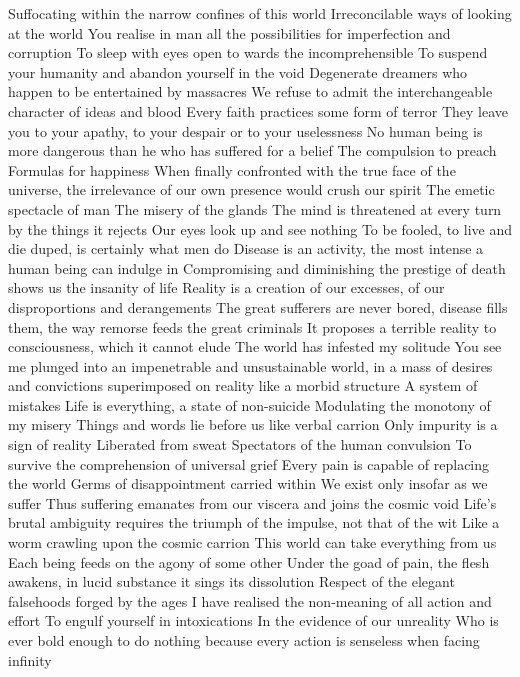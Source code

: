 \documentclass{article}
\begin{document}
Suffocating within the narrow confines of this world
Irreconcilable ways of looking at the world
You realise in man all the possibilities for imperfection and corruption
To sleep with eyes open to wards the incomprehensible
To suspend your humanity and abandon yourself in the void
Degenerate dreamers who happen to be entertained by massacres
We refuse to admit the interchangeable character of ideas and blood
Every faith practices some form of terror
They leave you to your apathy, to your despair or to your uselessness
No human being is more dangerous than he who has suffered for a belief
The compulsion to preach
Formulas for happiness
When finally confronted with the true face of the universe, the irrelevance of our own presence would crush our spirit
The emetic spectacle of man
The misery of the glands
The mind is threatened at every turn by the things it rejects
Our eyes look up and see nothing
To be fooled, to live and die duped, is certainly what men do
Disease is an activity, the most intense a human being can indulge in
Compromising and diminishing the prestige of death shows us the insanity of life
Reality is a creation of our excesses, of our disproportions and derangements
The great sufferers are never bored, disease fills them, the way remorse feeds the great criminals
It proposes a terrible reality to consciousness, which it cannot elude
The world has infested my solitude
You see me plunged into an impenetrable and unsustainable world, in a mass of desires and convictions superimposed on reality like a morbid structure
A system of mistakes
Life is everything, a state of non-suicide
Modulating the monotony of my misery
Things and words lie before us like verbal carrion
Only impurity is a sign of reality
Liberated from sweat
Spectators of the human convulsion
To survive the comprehension of universal grief
Every pain is capable of replacing the world
Germs of disappointment carried within
We exist only insofar as we suffer
Thus suffering emanates from our viscera and joins the cosmic void
Life's brutal ambiguity requires the triumph of the impulse, not that of the wit
Like a worm crawling upon the cosmic carrion
This world can take everything from us
Each being feeds on the agony of some other
Under the goad of pain, the flesh awakens, in lucid substance it sings its dissolution
Respect of the elegant falsehoods forged by the ages
I have realised the non-meaning of all action and effort
To engulf yourself in intoxications
In the evidence of our unreality
Who is ever bold enough to do nothing because every action is senseless when facing infinity
\end{document}
